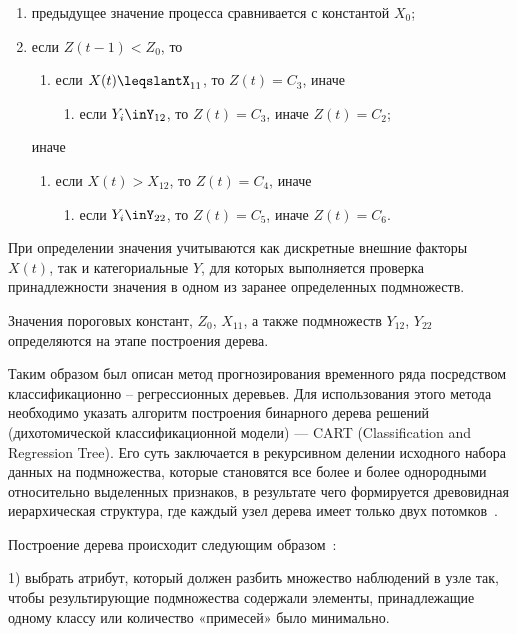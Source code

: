 \begin{enumerate}
    \item предыдущее значение процесса сравнивается с константой $X_0$;
    \item если $Z(t-1)<Z_0$, то
    \begin{enumerate}
        \item[2.1)] если $X(t)\leqslantX_{11}$, то $Z(t)=C_3$, иначе
        \begin{enumerate}
                  \item[2.1.1)] если $Y_i\inY_{12}$, то $Z(t)=C_3$, иначе $Z(t)=C_2$;
        \end{enumerate}
    \end{enumerate}
    иначе
    \begin{enumerate}
        \item[2.2)] если $X(t)>X_{12}$, то $Z(t)=C_4$, иначе
        \begin{enumerate}
            \item[2.2.1)] если $Y_i\inY_{22}$, то $Z(t)=C_5$, иначе $Z(t)=C_6$.
        \end{enumerate}
    \end{enumerate}
\end{enumerate}

При определении значения учитываются как дискретные внешние факторы $X(t)$, так и категориальные $Y$,
для которых выполняется проверка принадлежности значения в одном из заранее определенных подмножеств.

Значения пороговых констант, $Z_0$, $X_{11}$, а также подмножеств $Y_{12}$, $Y_{22}$ определяются на этапе построения дерева.

Таким образом был описан метод прогнозирования временного ряда посредством классификационно -- регрессионных деревьев.
Для использования этого метода необходимо указать алгоритм построения бинарного дерева решений
(дихотомической классификационной модели) --- CART (Classification and Regression Tree).
Его суть заключается в рекурсивном делении исходного набора данных на подмножества, которые становятся все более и
более однородными относительно выделенных признаков, в результате чего формируется древовидная иерархическая структура,
где каждый узел дерева имеет только двух потомков~\cite{poliref11, poliref12, poliref13, poliref14}.

Построение дерева происходит следующим образом~\cite{poliref11, poliref12, poliref13, poliref14}:

1) выбрать атрибут, который должен разбить множество наблюдений в узле так,
чтобы результирующие подмножества содержали элементы, принадлежащие одному классу или количество «примесей» было минимально.

